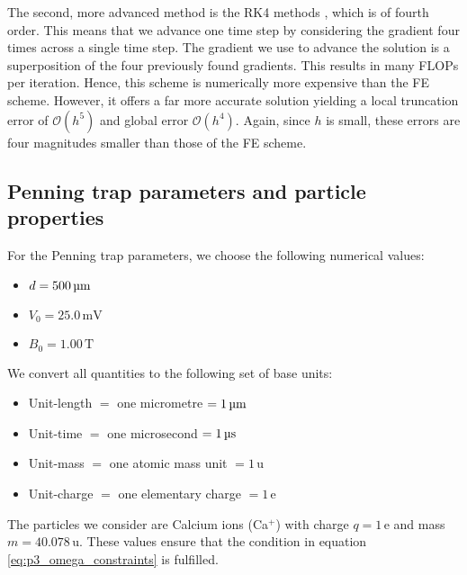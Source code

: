 The second, more advanced method is the RK4 methods \citep{Atkinson1989}, which is of fourth order. This means that we advance one time step by considering the gradient four times across a single time step. The gradient we use to advance the solution is a superposition of the four previously found gradients. This results in many FLOPs per iteration. Hence, this scheme is numerically more expensive than the FE scheme. However, it offers a far more accurate solution yielding a local truncation error of $\mathcal{O}(h^5)$ and global error $\mathcal{O}(h^4)$. Again, since $h$ is small, these errors are four magnitudes smaller than those of the FE scheme. 


\subsection{Penning trap parameters and particle properties}\label{subsec_methods:numbers_and_units}
For the Penning trap parameters, we choose the following numerical values:
\begin{itemize}
    \item[] $d=500 \,\mathrm{\text{\textmu} m}$
    \item[] $V_0=25.0 \,\mathrm{mV}$
    \item[] $B_0=1.00 \,\mathrm{T}$
\end{itemize}
We convert all quantities to the following set of base units:
\begin{itemize}
    \item[] Unit-length $=$ one micrometre $= 1\, \mathrm{\text{\textmu}m} $ 
    \item[] Unit-time $=$ one microsecond $= 1\, \mathrm{\text{\textmu}s} $
    \item[] Unit-mass $=$ one atomic mass unit $= 1\, \mathrm{u} $
    \item[] Unit-charge $=$ one elementary charge $= 1\, \mathrm{e} $
\end{itemize}
The particles we consider are Calcium ions (Ca$^+$) with charge $q=1 \,\mathrm{e}$ and mass $m = 40.078 \,\mathrm{u}$. These values ensure that the condition in equation \eqref{eq:p3_omega_constraints} is fulfilled. 


